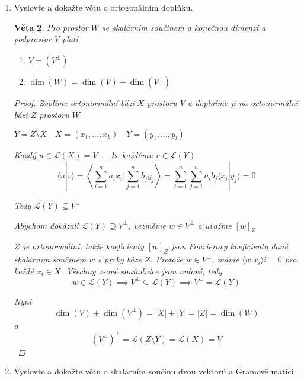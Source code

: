 \documentclass[10pt,a4paper]{article}
\theoremstyle{plain}
\newtheorem{veta}{Věta}
\begin{document}
\begin{enumerate}
\begin{veta}
\begin{proof}
Tedy \[ [w]_X^H[u]_X = [w]^H_X[f]^H_{XY}[f]_{XY}[u]_X\]
\[[f]^H_{XY} =[f]^{-1}_{XY}\]

$[f]_{XY}$ je unitární.

\end{proof}
\end{veta}

\item Vyslovte a dokažte větu o ortogonálním doplňku.

\begin{veta}
Pro prostor $W$ se skalárním součinem a konečnou dimenzí a podprostor $V$ platí \begin{enumerate}[label=(\alph*)]
\item $V = (V^\perp)^\perp$
\item $\dim(W) = \dim(V) + \dim(V^\perp)$
\end{enumerate}
\begin{proof}
Zvolíme ortonormální bázi $X$ prostoru $V$ a doplníme ji na ortonormální bázi $Z$ prostoru $W$

$Y = Z \setminus X \quad X = (x_1, ..., x_k) \quad Y = (y_1, ..., y_l)$

Každý $u \in \mathcal{L}(X) = V \perp$ ke každému $v \in \mathcal{L}(Y)$
\[ \langle u|v \rangle = \left\langle \sum^n_{i=1} a_ix_i | \sum^n_{j=1} b_jy_j \right\rangle =  \sum^n_{i=1}  \sum^n_{j=1} a_i \overline{b_j} \langle x_i | y_j \rangle = 0 \]

Tedy $ \mathcal{L}(Y) \subseteq V^\perp$

Abychom dokázali $ \mathcal{L}(Y) \supseteq V^\perp$, vezměme $w \in V^\perp$ a uvažme $[w]_Z$

$Z$ je ortonormální, takže koeficienty $[w]_Z$ jsou Fourierovy koeficienty dané skalárním součinem $w$ s prvky báze $Z$.
Protože $w \in V^\perp$, máme $\langle w|x_i \rangle i = 0$ pro každé $x_i \in X$. Všechny x-ové souřadnice jsou nulové, tedy \[w \in \mathcal{L}(Y) \implies V^\perp \subseteq \mathcal{L}(Y) \implies V^\perp = \mathcal{L}(Y)\]

\hfill

Nyní \[ \dim(V) + \dim(V^\perp) = |X| + |Y| = |Z| = \dim(W) \]
a \[(V^\perp)^\perp =  \mathcal{L}(Z \setminus Y) =  \mathcal{L}(X) = V  \]
\end{proof}
\end{veta}

\item Vyslovte a dokažte větu o skalárním součinu dvou vektorů a Gramově matici.



\end{enumerate}
\end{document}
